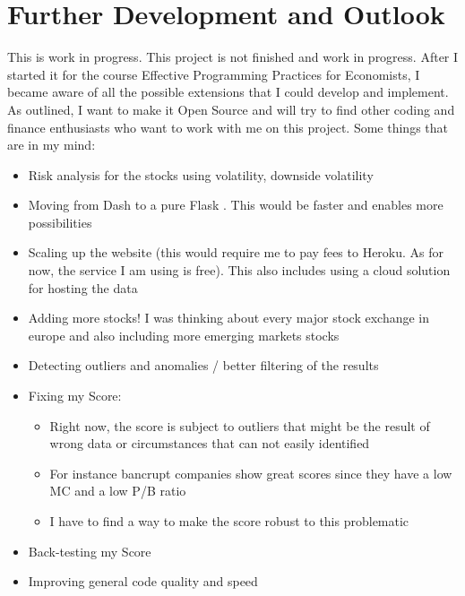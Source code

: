 \documentclass[11pt, a4paper, leqno]{article}
\begin{document}
\section{Further Development and Outlook}
This is work in progress. This project is not finished and work in progress. After I started it for the course Effective Programming Practices for Economists, 
I became aware of all the possible extensions that I could develop and implement. 
As outlined, I want to make it Open Source and will try to find other coding and finance enthusiasts who want to work with me on this project.
Some things that are in my mind:
\begin{itemize}
    \item Risk analysis for the stocks using volatility, downside volatility
    \item Moving from Dash to a pure Flask . This would be faster and enables more possibilities    
    \item Scaling up the website (this would require me to pay fees to Heroku. As for now, the service I am using is free). This also includes using a cloud solution for hosting the data
    \item Adding more stocks! I was thinking about every major stock exchange in europe and also including more emerging markets stocks
    \item Detecting outliers and anomalies / better filtering of the results
    \item Fixing my Score:
    \begin{itemize}
        \item Right now, the score is subject to outliers that might be the result of wrong data or circumstances that can not easily identified
        \item For instance bancrupt companies show great scores since they have a low MC and a low P/B ratio
        \item I have to find a way to make the score robust to this problematic
    \end{itemize} 
    \item Back-testing my Score
    \item Improving general code quality and speed
\end{itemize}



\printbibliography
{}





\end{document}
